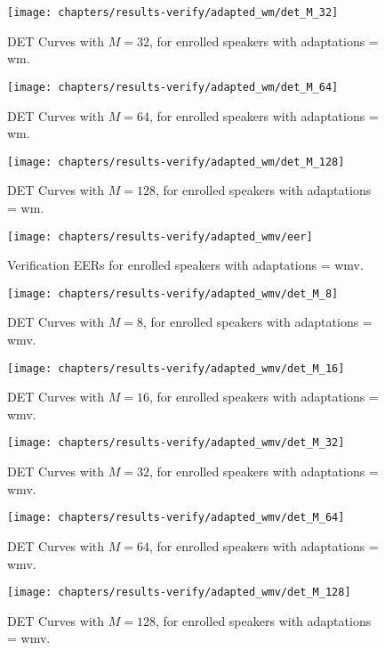 \newpage
\begin{figure}[ht]
	\centering
	\texttt{[image: chapters/results-verify/adapted\_wm/det\_M\_32]}
	\caption{DET Curves with $M = 32$, for enrolled speakers with adaptations = wm.}
	\label{fig:results-verify-adapted_wm-M_32}
\end{figure}

\begin{figure}[ht]
	\centering
	\texttt{[image: chapters/results-verify/adapted\_wm/det\_M\_64]}
	\caption{DET Curves with $M = 64$, for enrolled speakers with adaptations = wm.}
	\label{fig:results-verify-adapted_wm-M_64}
\end{figure}

\newpage
\begin{figure}[ht]
	\centering
	\texttt{[image: chapters/results-verify/adapted\_wm/det\_M\_128]}
	\caption{DET Curves with $M = 128$, for enrolled speakers with adaptations = wm.}
	\label{fig:results-verify-adapted_wm-M_128}
\end{figure}

\clearpage

\newpage


\begin{figure}[ht]
	\centering
	\texttt{[image: chapters/results-verify/adapted\_wmv/eer]}
	\caption{Verification EERs for enrolled speakers with adaptations = wmv.}
	\label{fig:results-verify-adapted_wmv}
\end{figure}

\newpage
\begin{figure}[ht]
	\centering
	\texttt{[image: chapters/results-verify/adapted\_wmv/det\_M\_8]}
	\caption{DET Curves with $M = 8$, for enrolled speakers with adaptations = wmv.}
	\label{fig:results-verify-adapted_wmv-M_8}
\end{figure}

\begin{figure}[ht]
	\centering
	\texttt{[image: chapters/results-verify/adapted\_wmv/det\_M\_16]}
	\caption{DET Curves with $M = 16$, for enrolled speakers with adaptations = wmv.}
	\label{fig:results-verify-adapted_wmv-M_16}
\end{figure}

\newpage
\begin{figure}[ht]
	\centering
	\texttt{[image: chapters/results-verify/adapted\_wmv/det\_M\_32]}
	\caption{DET Curves with $M = 32$, for enrolled speakers with adaptations = wmv.}
	\label{fig:results-verify-adapted_wmv-M_32}
\end{figure}

\begin{figure}[ht]
	\centering
	\texttt{[image: chapters/results-verify/adapted\_wmv/det\_M\_64]}
	\caption{DET Curves with $M = 64$, for enrolled speakers with adaptations = wmv.}
	\label{fig:results-verify-adapted_wmv-M_64}
\end{figure}

\newpage
\begin{figure}[ht]
	\centering
	\texttt{[image: chapters/results-verify/adapted\_wmv/det\_M\_128]}
	\caption{DET Curves with $M = 128$, for enrolled speakers with adaptations = wmv.}
	\label{fig:results-verify-adapted_wmv-M_128}
\end{figure}

\clearpage
